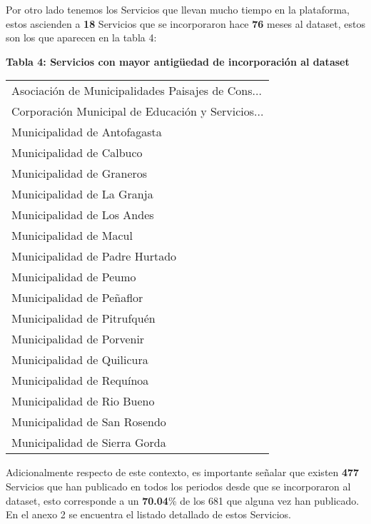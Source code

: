 \documentclass[11pt]{article}
\begin{document}
    
    Por otro lado tenemos los Servicios que llevan mucho tiempo en la
plataforma, estos ascienden a \textbf{18} Servicios que se incorporaron
hace \textbf{76} meses al dataset, estos son los que aparecen en la
tabla 4:

\textbf{Tabla 4: Servicios con mayor antigüedad de incorporación al
dataset}

    \begin{tabular}{l}
\toprule
 Asociación de Municipalidades Paisajes de Cons... \\
 Corporación Municipal de Educación y Servicios... \\
                      Municipalidad de Antofagasta \\
                          Municipalidad de Calbuco \\
                         Municipalidad de Graneros \\
                        Municipalidad de La Granja \\
                        Municipalidad de Los Andes \\
                            Municipalidad de Macul \\
                    Municipalidad de Padre Hurtado \\
                            Municipalidad de Peumo \\
                         Municipalidad de Peñaflor \\
                       Municipalidad de Pitrufquén \\
                         Municipalidad de Porvenir \\
                        Municipalidad de Quilicura \\
                         Municipalidad de Requínoa \\
                        Municipalidad de Rio Bueno \\
                      Municipalidad de San Rosendo \\
                     Municipalidad de Sierra Gorda \\
\bottomrule
\end{tabular}

    
    Adicionalmente respecto de este contexto, es importante señalar que
existen \textbf{477} Servicios que han publicado en todos los periodos
desde que se incorporaron al dataset, esto corresponde a un
\textbf{70.04}\% de los 681 que alguna vez han publicado. En el anexo 2
se encuentra el listado detallado de estos Servicios.
\end{document}
